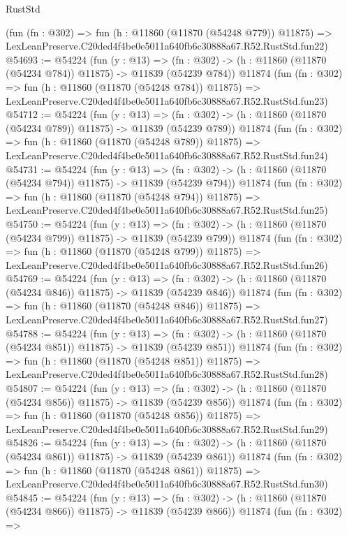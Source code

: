\begin{lexlean}{RustStd}
\begin{coremodule}
    (fun (fn : @302) =>
    fun (h : @11860 (@11870 (@54248 @779)) @11875) =>
    LexLeanPreserve.C20ded4f4be0e5011a640fb6c30888a67.R52.RustStd.fun22)
@54693 := @54224
    (fun (y : @13) =>
    (fn : @302) -> (h : @11860 (@11870 (@54234 @784)) @11875) -> @11839 (@54239 @784))
    @11874
    (fun (fn : @302) =>
    fun (h : @11860 (@11870 (@54248 @784)) @11875) =>
    LexLeanPreserve.C20ded4f4be0e5011a640fb6c30888a67.R52.RustStd.fun23)
@54712 := @54224
    (fun (y : @13) =>
    (fn : @302) -> (h : @11860 (@11870 (@54234 @789)) @11875) -> @11839 (@54239 @789))
    @11874
    (fun (fn : @302) =>
    fun (h : @11860 (@11870 (@54248 @789)) @11875) =>
    LexLeanPreserve.C20ded4f4be0e5011a640fb6c30888a67.R52.RustStd.fun24)
@54731 := @54224
    (fun (y : @13) =>
    (fn : @302) -> (h : @11860 (@11870 (@54234 @794)) @11875) -> @11839 (@54239 @794))
    @11874
    (fun (fn : @302) =>
    fun (h : @11860 (@11870 (@54248 @794)) @11875) =>
    LexLeanPreserve.C20ded4f4be0e5011a640fb6c30888a67.R52.RustStd.fun25)
@54750 := @54224
    (fun (y : @13) =>
    (fn : @302) -> (h : @11860 (@11870 (@54234 @799)) @11875) -> @11839 (@54239 @799))
    @11874
    (fun (fn : @302) =>
    fun (h : @11860 (@11870 (@54248 @799)) @11875) =>
    LexLeanPreserve.C20ded4f4be0e5011a640fb6c30888a67.R52.RustStd.fun26)
@54769 := @54224
    (fun (y : @13) =>
    (fn : @302) -> (h : @11860 (@11870 (@54234 @846)) @11875) -> @11839 (@54239 @846))
    @11874
    (fun (fn : @302) =>
    fun (h : @11860 (@11870 (@54248 @846)) @11875) =>
    LexLeanPreserve.C20ded4f4be0e5011a640fb6c30888a67.R52.RustStd.fun27)
@54788 := @54224
    (fun (y : @13) =>
    (fn : @302) -> (h : @11860 (@11870 (@54234 @851)) @11875) -> @11839 (@54239 @851))
    @11874
    (fun (fn : @302) =>
    fun (h : @11860 (@11870 (@54248 @851)) @11875) =>
    LexLeanPreserve.C20ded4f4be0e5011a640fb6c30888a67.R52.RustStd.fun28)
@54807 := @54224
    (fun (y : @13) =>
    (fn : @302) -> (h : @11860 (@11870 (@54234 @856)) @11875) -> @11839 (@54239 @856))
    @11874
    (fun (fn : @302) =>
    fun (h : @11860 (@11870 (@54248 @856)) @11875) =>
    LexLeanPreserve.C20ded4f4be0e5011a640fb6c30888a67.R52.RustStd.fun29)
@54826 := @54224
    (fun (y : @13) =>
    (fn : @302) -> (h : @11860 (@11870 (@54234 @861)) @11875) -> @11839 (@54239 @861))
    @11874
    (fun (fn : @302) =>
    fun (h : @11860 (@11870 (@54248 @861)) @11875) =>
    LexLeanPreserve.C20ded4f4be0e5011a640fb6c30888a67.R52.RustStd.fun30)
@54845 := @54224
    (fun (y : @13) =>
    (fn : @302) -> (h : @11860 (@11870 (@54234 @866)) @11875) -> @11839 (@54239 @866))
    @11874
    (fun (fn : @302) =>

\end{coremodule}
\end{lexlean}
